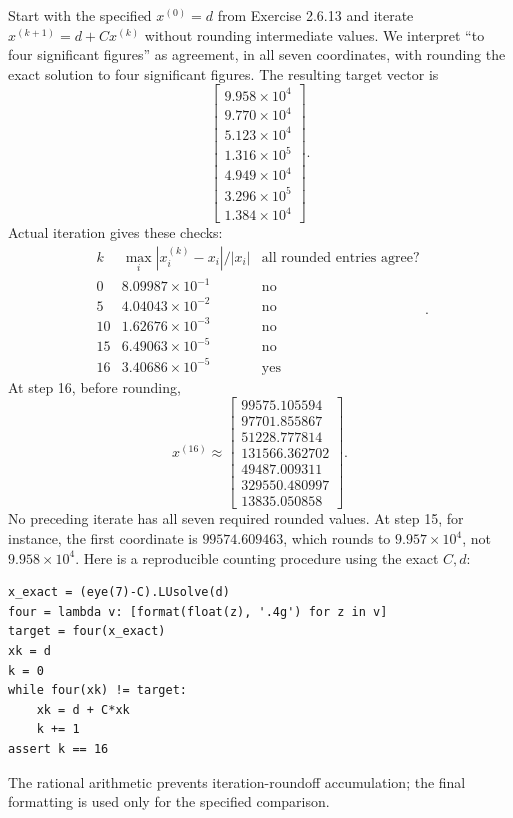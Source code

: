 Start with the specified $x^{(0)}=d$ from Exercise 2.6.13 and
iterate $x^{(k+1)}=d+Cx^{(k)}$ without rounding intermediate values.
We interpret ``to four significant figures'' as agreement, in all
seven coordinates, with rounding the exact solution to four significant
figures. The resulting target vector is
\[\begin{bmatrix}9.958\times10^4\\9.770\times10^4\\5.123\times10^4\\
1.316\times10^5\\4.949\times10^4\\3.296\times10^5\\1.384\times10^4\end{bmatrix}.\]
Actual iteration gives these checks:
\[\begin{array}{c|r|c}
k&\max_i |x_i^{(k)}-x_i|/|x_i|&\text{all rounded entries agree?}\\\hline
0&8.09987\times10^{-1}&\text{no}\\
5&4.04043\times10^{-2}&\text{no}\\
10&1.62676\times10^{-3}&\text{no}\\
15&6.49063\times10^{-5}&\text{no}\\
16&3.40686\times10^{-5}&\text{yes}
\end{array}.\]
At step 16, before rounding,
\[x^{(16)}\approx\begin{bmatrix}
99575.105594\\97701.855867\\51228.777814\\131566.362702\\
49487.009311\\329550.480997\\13835.050858\end{bmatrix}.\]
No preceding iterate has all seven required rounded values. At step
15, for instance, the first coordinate is $99574.609463$, which
rounds to $9.957\times10^4$, not $9.958\times10^4$.
Here is a reproducible counting procedure using the exact $C,d$:
\begin{verbatim}
x_exact = (eye(7)-C).LUsolve(d)
four = lambda v: [format(float(z), '.4g') for z in v]
target = four(x_exact)
xk = d
k = 0
while four(xk) != target:
    xk = d + C*xk
    k += 1
assert k == 16
\end{verbatim}
The rational arithmetic prevents iteration-roundoff accumulation;
the final formatting is used only for the specified comparison.
